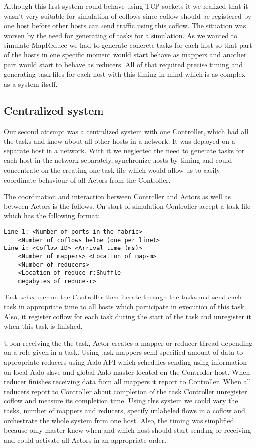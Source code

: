 \documentclass[conference]{IEEEtran}
\begin{document}
Although this first system could behave using TCP sockets it we realized that it wasn’t very suitable for simulation of coflows since coflow should be registered by one host before other hosts can send traffic using this coflow. The situation was worsen by the need for generating of tasks for a simulation. As we wanted to simulate MapReduce we had to generate concrete tasks for each host so that part of the hosts in one specific moment would start behave as mappers and another part would start to behave as reducers. All of that required precise timing and generating task files for each host with this timing in mind which is as complex as a system itself.

\subsection{Centralized system}
Our second attempt was a centralized system with one Controller, which had all the tasks and knew about all other hosts in a network. It was deployed on a separate host in a network. With it we neglected the need to generate tasks for each host in the network separately, synchronize hosts by timing and could concentrate on the creating one task file which would allow us to easily coordinate behaviour of all Actors from the Controller.

The coordination and interaction between Controller and Actors as well as between Actors is the follows. On start of simulation Controller accept a task file which has the following format:

\begin{lstlisting}
Line 1: <Number of ports in the fabric> 
    <Number of coflows below (one per line)>
Line i: <Coflow ID> <Arrival time (ms)>
    <Number of mappers> <Location of map-m> 
    <Number of reducers> 
    <Location of reduce-r:Shuffle
    megabytes of reduce-r>
\end{lstlisting}

Task scheduler on the Controller then iterate through the tasks and send each task in appropriate time to all hosts which participate in execution of this task. Also, it register coflow for each task during the start of the task and unregister it when this task is finished.

Upon receiving the the task, Actor creates a mapper or reducer thread depending on a role given in a task. Using task mappers send specified amount of data to appropriate reducers using Aalo API which schedules sending using information on local Aalo slave and global Aalo master located on the Controller host. When reducer finishes receiving data from all mappers it report to Controller. When all reducers report to Controller about completion of the task Controller unregister coflow and measure its completion time.
Using this system we could vary the tasks, number of mappers and reducers, specify unlabeled flows in a coflow and orchestrate the whole system from one host. Also, the timing was simplified because only master knew when and which host should start sending or receiving and could activate all Actors in an appropriate order. 
\end{document}
